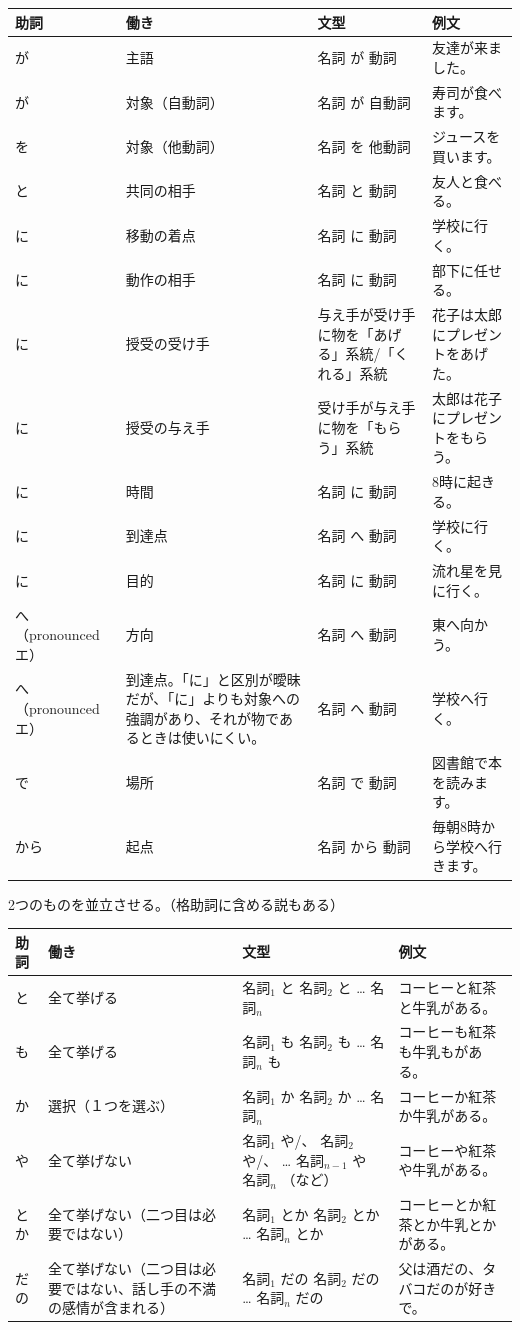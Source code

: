 \documentclass[a4paper,12pt]{article}
\begin{document}
\begin{longtable}[c]{|C{0.1\textwidth}|C{0.2\textwidth}|C{0.25\textwidth}|C{0.25\textwidth}|}
\hline
助詞 & 働き & 文型 & 例文 \\\hline\endhead
が & 主語 & 名詞 が 動詞 & 友達が来ました。 \\\hline
が & 対象（自動詞） & 名詞 が 自動詞 & 寿司が食べます。 \\\hline
を & 対象（他動詞） & 名詞 を 他動詞 & ジュースを買います。 \\\hline
と & 共同の相手 & 名詞 と 動詞 & 友人と食べる。 \\\hline
に & 移動の着点 & 名詞 に 動詞 & 学校に行く。 \\\hline
に & 動作の相手 & 名詞 に 動詞 & 部下に任せる。 \\\hline
に & 授受の受け手 & 与え手が受け手に物を「あげる」系統/「くれる」系統 & 花子は太郎にプレゼントをあげた。 \\\hline
に & 授受の与え手 & 受け手が与え手に物を「もらう」系統 & 太郎は花子にプレゼントをもらう。 \\\hline
に & 時間 & 名詞 に 動詞 & 8時に起きる。 \\\hline
に & 到達点 & 名詞 へ 動詞 & 学校に行く。 \\\hline
に & 目的 & 名詞 に 動詞 & 流れ星を見に行く。 \\\hline
へ （pronounced エ） & 方向 & 名詞 へ 動詞 & 東へ向かう。 \\\hline
へ （pronounced エ） & 到達点。「に」と区別が曖昧だが、「に」よりも対象への強調があり、それが物であるときは使いにくい。 & 名詞 へ 動詞 & 学校へ行く。 \\\hline
で & 場所 & 名詞 で 動詞 & 図書館で本を読みます。 \\\hline
から & 起点 & 名詞 から 動詞 & 毎朝8時から学校へ行きます。 \\\hline
\end{longtable}
2つのものを並立させる。（格助詞に含める説もある）
\begin{longtable}[c]{|C{0.1\textwidth}|C{0.2\textwidth}|C{0.25\textwidth}|C{0.25\textwidth}|}
\hline
助詞 & 働き & 文型 & 例文 \\\hline
と & 全て挙げる & 名詞$_1$ と 名詞$_2$ と … 名詞$_n$ & コーヒーと紅茶と牛乳がある。 \\\hline
も & 全て挙げる & 名詞$_1$ も 名詞$_2$ も … 名詞$_n$ も & コーヒーも紅茶も牛乳もがある。 \\\hline
か & 選択（１つを選ぶ） & 名詞$_1$ か 名詞$_2$ か … 名詞$_n$ & コーヒーか紅茶か牛乳がある。 \\\hline
や & 全て挙げない & 名詞$_1$ や/、 名詞$_2$ や/、 … 名詞$_{n-1}$ や 名詞$_n$ （など） & コーヒーや紅茶や牛乳がある。 \\\hline
とか & 全て挙げない（二つ目は必要ではない） & 名詞$_1$ とか 名詞$_2$ とか … 名詞$_n$ とか & コーヒーとか紅茶とか牛乳とかがある。 \\\hline
だの & 全て挙げない（二つ目は必要ではない、話し手の不満の感情が含まれる） & 名詞$_1$ だの 名詞$_2$ だの … 名詞$_n$ だの & 父は酒だの、タバコだのが好きで。 \\\hline
\end{longtable}
\end{document}
